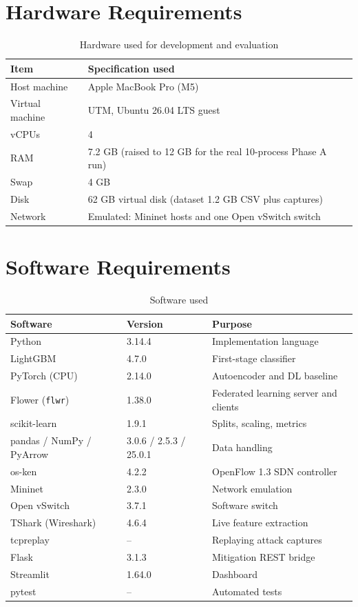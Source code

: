 \section{Hardware Requirements}
\begin{table}[H]
\centering
\renewcommand{\arraystretch}{1.25}
\begin{tabular}{|p{4cm}|p{9.5cm}|}
\hline
\textbf{Item} & \textbf{Specification used} \\ \hline
Host machine & Apple MacBook Pro (M5) \\ \hline
Virtual machine & UTM, Ubuntu 26.04 LTS guest \\ \hline
vCPUs & 4 \\ \hline
RAM & 7.2 GB (raised to 12 GB for the real 10-process Phase A run) \\ \hline
Swap & 4 GB \\ \hline
Disk & 62 GB virtual disk (dataset 1.2 GB CSV plus captures) \\ \hline
Network & Emulated: Mininet hosts and one Open vSwitch switch \\ \hline
\end{tabular}
\caption{Hardware used for development and evaluation}
\end{table}

\section{Software Requirements}
\begin{table}[H]
\centering
\renewcommand{\arraystretch}{1.25}
\begin{tabular}{|p{4.5cm}|p{3cm}|p{6cm}|}
\hline
\textbf{Software} & \textbf{Version} & \textbf{Purpose} \\ \hline
Python & 3.14.4 & Implementation language \\ \hline
LightGBM & 4.7.0 & First-stage classifier \\ \hline
PyTorch (CPU) & 2.14.0 & Autoencoder and DL baseline \\ \hline
Flower (\texttt{flwr}) & 1.38.0 & Federated learning server and clients \\ \hline
scikit-learn & 1.9.1 & Splits, scaling, metrics \\ \hline
pandas / NumPy / PyArrow & 3.0.6 / 2.5.3 / 25.0.1 & Data handling \\ \hline
os-ken & 4.2.2 & OpenFlow 1.3 SDN controller \\ \hline
Mininet & 2.3.0 & Network emulation \\ \hline
Open vSwitch & 3.7.1 & Software switch \\ \hline
TShark (Wireshark) & 4.6.4 & Live feature extraction \\ \hline
tcpreplay & -- & Replaying attack captures \\ \hline
Flask & 3.1.3 & Mitigation REST bridge \\ \hline
Streamlit & 1.64.0 & Dashboard \\ \hline
pytest & -- & Automated tests \\ \hline
\end{tabular}
\caption{Software used}
\end{table}


